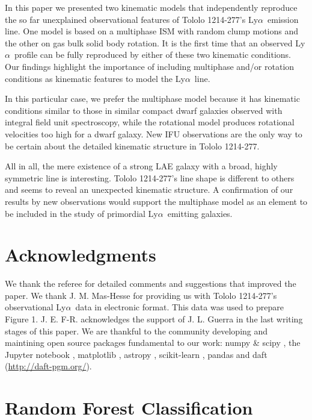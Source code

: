 \documentclass[a4paper,fleqn,usenatbib]{mnras}
\newcommand{\tol}{Tololo 1214-277}
\newcommand{\lya}{\ifmmode{{\rm Ly}\alpha}\else Ly$\alpha$\ \fi}
\begin{document}
In this paper we presented two kinematic models that independently
reproduce the so far unexplained observational features of \tol's
\lya emission line.
One model is based on a multiphase ISM with random clump motions and
the other on gas bulk solid body rotation. 
It is the first time that an observed \lya profile can be fully
reproduced by either of these two kinematic conditions.
Our findings highlight the importance of including multiphase and/or
rotation conditions as kinematic features to model the \lya line.

In this particular case, we prefer the multiphase model because it has kinematic
conditions similar to those in similar compact dwarf galaxies observed
with integral field unit spectroscopy, while the
rotational model produces rotational velocities too high for a dwarf
galaxy.  
New IFU observations are the only way to be certain about the detailed
kinematic structure in \tol.  

All in all, the mere existence of a strong LAE galaxy with a broad,
highly symmetric line is interesting. 
\tol's line shape is different to others and seems to reveal an
unexpected kinematic structure.
A confirmation of our results by new observations would support the multiphase model
as an element to be included in the study of primordial \lya emitting
galaxies.
 
\section*{Acknowledgments}
We thank the referee for detailed comments and suggestions that
improved the paper. 
We thank J. M. Mas-Hesse for providing us with \tol's observational
\lya data \citep{mashesse03} in electronic format. This data was
used to prepare Figure 1.
J. E. F-R. acknowledges the support of J. L. Guerra in the last
writing stages of this paper.
We are thankful to the community developing and maintining open source
packages fundamental to our work: numpy \& scipy \citep{numpy}, the
Jupyter notebook \citep{IPython,jupyter}, matplotlib
\citep{matplotlib}, astropy \citep{astropy},  scikit-learn
\citep{scikit-learn}, pandas \citep{pandas} and daft
(\url{http://daft-pgm.org/}).  






\appendix
\section{Random Forest Classification}
\label{appendix}
\end{document}
